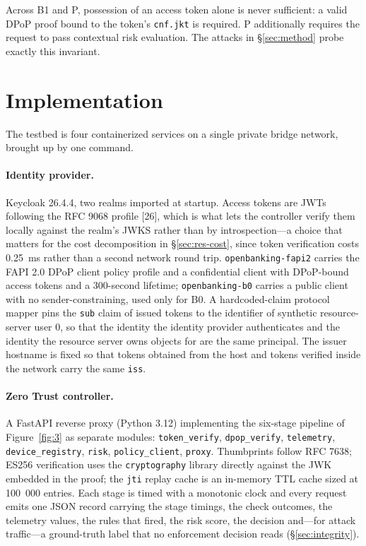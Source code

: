 Across B1 and P, possession of an access token alone is never sufficient: a valid DPoP proof bound to the token's \texttt{cnf.jkt} is required. P additionally requires the request to pass contextual risk evaluation. The attacks in \S\ref{sec:method} probe exactly this invariant.

\section{Implementation}
\label{sec:implementation}

The testbed is four containerized services on a single private bridge network, brought up by one command.

\paragraph{Identity provider.} Keycloak 26.4.4, two realms imported at startup. Access tokens are JWTs following the RFC 9068 profile [26], which is what lets the controller verify them locally against the realm's JWKS rather than by introspection---a choice that matters for the cost decomposition in \S\ref{sec:res-cost}, since token verification costs 0.25~ms rather than a second network round trip. \texttt{openbanking-fapi2} carries the FAPI 2.0 DPoP client policy profile and a confidential client with DPoP-bound access tokens and a 300-second lifetime; \texttt{openbanking-b0} carries a public client with no sender-constraining, used only for B0. A hardcoded-claim protocol mapper pins the \texttt{sub} claim of issued tokens to the identifier of synthetic resource-server user 0, so that the identity the identity provider authenticates and the identity the resource server owns objects for are the same principal. The issuer hostname is fixed so that tokens obtained from the host and tokens verified inside the network carry the same \texttt{iss}.

\paragraph{Zero Trust controller.} A FastAPI reverse proxy (Python 3.12) implementing the six-stage pipeline of Figure~\ref{fig:3} as separate modules: \texttt{token\_verify}, \texttt{dpop\_verify}, \texttt{telemetry}, \texttt{device\_registry}, \texttt{risk}, \texttt{policy\_client}, \texttt{proxy}. Thumbprints follow RFC 7638; ES256 verification uses the \texttt{cryptography} library directly against the JWK embedded in the proof; the \texttt{jti} replay cache is an in-memory TTL cache sized at 100~000 entries. Each stage is timed with a monotonic clock and every request emits one JSON record carrying the stage timings, the check outcomes, the telemetry values, the rules that fired, the risk score, the decision and---for attack traffic---a ground-truth label that no enforcement decision reads (\S\ref{sec:integrity}).


